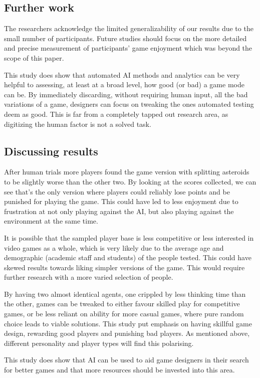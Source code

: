 \subsection{Further work}

The researchers acknowledge the limited generalizability of our results due to the small number of participants. Future studies should focus on the more detailed and precise measurement of participants’ game enjoyment which was beyond the scope of this paper.

This study does show that automated AI methods and analytics can be very helpful to assessing, at least at a broad level, how good (or bad) a game mode can be. By immediately discarding, without requiring human input, all the bad variations of a game, designers can focus on tweaking the ones automated testing deem as good. This is far from a completely tapped out research area, as digitizing the human factor is not a solved task.

\subsection{Discussing results}

After human trials more players found the game version with splitting asteroids to be slightly worse than the other two. By looking at the scores collected, we can see that's the only version where players could reliably lose points and be punished for playing the game. This could have led to less enjoyment due to frustration at not only playing against the AI, but also playing against the environment at the same time. 

It is possible that the sampled player base is less competitive or less interested in video games as a whole, which is very likely due to the average age and demographic (academic staff and students) of the people tested. This could have skewed results towards liking simpler versions of the game. This would require further research with a more varied selection of people.

By having two almost identical agents, one crippled by less thinking time than the other, games can be tweaked to either favour skilled play for competitive games, or be less reliant on ability for more casual games, where pure random choice leads to viable solutions. This study put emphasis on having skillful game design, rewarding good players and punishing bad players. As mentioned above, different personality and player types will find this polarising. 

This study does show that AI can be used to aid game designers in their search for better games and that more resources should be invested into this area.
